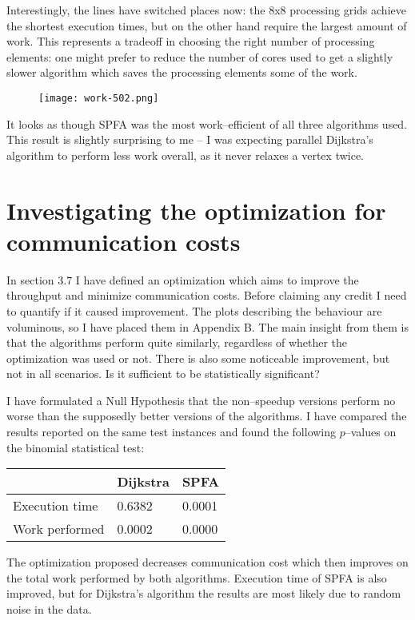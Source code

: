 \documentclass[12pt,a4paper,twoside,openright]{report}
\begin{document}
Interestingly, the lines have switched places now: the $8$x$8$ processing grids achieve the shortest execution times, but on the other hand require the largest amount of work. This represents a tradeoff in choosing the right number of processing elements: one might prefer to reduce the number of cores used to get a slightly slower algorithm which saves the processing elements some of the work.

\begin{figure}[ht]
\centering
\texttt{[image: work-502.png]}
\end{figure}

It looks as though SPFA was the most work--efficient of all three algorithms used. This result is slightly surprising to me -- I was expecting parallel Dijkstra's algorithm to perform less work overall, as it never relaxes a vertex twice.

\section{Investigating the optimization for communication costs}
In section $3.7$ I have defined an optimization which aims to improve the throughput and minimize communication costs. Before claiming any credit I need to quantify if it caused  improvement. The plots describing the behaviour are voluminous, so I have placed them in Appendix B. The main insight from them is that the algorithms perform quite similarly, regardless of whether the optimization was used or not. There is also some noticeable improvement, but not in all scenarios. Is it sufficient to be statistically significant?

I have formulated a Null Hypothesis that the non--speedup versions perform no worse than the supposedly better versions of the algorithms. I have compared the results reported on the same test instances and found the following $p$--values on the binomial statistical test:

\begin{center}
\begin{tabular}{|l|l|l|}
\hline
\centering & Dijkstra & SPFA \\ \hline
\centering Execution time & 0.6382 & 0.0001 \\ \hline
\centering Work performed & 0.0002 & 0.0000 \\ \hline
\end{tabular}
\end{center}

The optimization proposed decreases communication cost which then improves on the total work performed by both algorithms. Execution time of SPFA is also improved, but for Dijkstra's algorithm the results are most likely due to random noise in the data.
\end{document}
